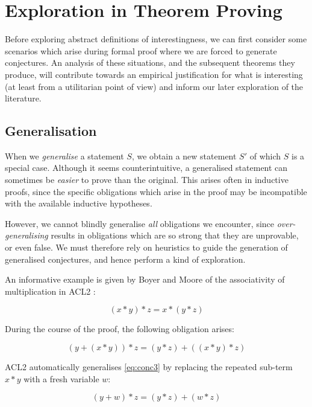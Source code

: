 \section{Exploration in Theorem Proving}
\label{sec:examples}

Before exploring abstract definitions of interestingness, we can first consider some scenarios which arise during formal proof where we are forced to generate conjectures. An analysis of these situations, and the subsequent theorems they produce, will contribute towards an empirical justification for what is interesting (at least from a utilitarian point of view) and inform our later exploration of the literature.

\subsection{Generalisation}

When we \emph{generalise} a statement $S$, we obtain a new statement $S'$ of which $S$ is a special case. Although it seems counterintuitive, a generalised statement can sometimes be \emph{easier} to prove than the original. This arises often in inductive proofs, since the specific obligations which arise in the proof may be incompatible with the available inductive hypotheses.

However, we cannot blindly generalise \emph{all} obligations we encounter, since \emph{over-generalising} results in obligations which are so strong that they are unprovable, or even false. We must therefore rely on heuristics to guide the generation of generalised conjectures, and hence perform a kind of exploration.

An informative example is given by Boyer and Moore of the associativity of multiplication in ACL2 \citep{boyer1983proof}:

$$(x * y) * z = x * (y * z)$$

During the course of the proof, the following obligation arises:

\begin{equation}
  \tag{conc3}
  (y + (x * y)) * z = (y * z) + ((x * y) * z)
  \label{eq:conc3}
\end{equation}

ACL2 automatically generalises \eqref{eq:conc3} by replacing the repeated sub-term $x * y$ with a fresh variable $w$:

\begin{equation}
  \tag{conc4}
  (y + w) * z = (y * z) + (w * z)
  \label{eq:conc4}
\end{equation}


